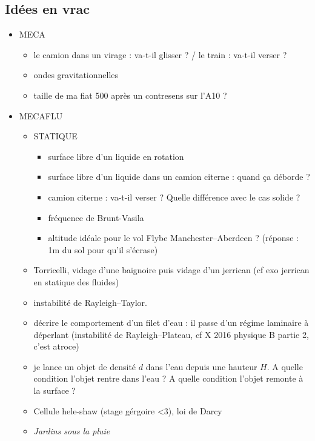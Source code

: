 \subsection*{Idées en vrac}
\begin{itemize}
    \item MECA
    \begin{itemize}
        \item le camion dans un virage : va-t-il glisser ? / le train : va-t-il verser ?
        \item ondes gravitationnelles
        \item taille de ma fiat 500 après un contresens sur l'A10 ?
    \end{itemize}
    \item MECAFLU
    \begin{itemize}
        \item STATIQUE
        \begin{itemize}
            \item surface libre d'un liquide en rotation
            \item surface libre d'un liquide dans un camion citerne : quand ça déborde ?
            \item camion citerne : va-t-il verser ? Quelle différence avec le cas solide ?
            \item fréquence de Brunt-Vasila
            \item altitude idéale pour le vol Flybe Manchester--Aberdeen ? (réponse : 1m du sol pour qu'il s'écrase)
        \end{itemize}
        \item Torricelli, vidage d'une baignoire puis vidage d'un jerrican (cf exo jerrican en statique des fluides)
        \item instabilité de Rayleigh--Taylor.
        \item décrire le comportement d'un filet d'eau : il passe d'un régime laminaire à déperlant (instabilité de Rayleigh--Plateau,  cf X 2016 physique B partie 2, c'est atroce)
        \item je lance un objet de densité $d$ dans l'eau depuis une hauteur $H$. A quelle condition l'objet rentre dans l'eau ? A quelle condition l'objet remonte à la surface ?
        \item Cellule hele-shaw (stage gérgoire <3), loi de Darcy
        \item \emph{Jardins sous la pluie}
            

\end{itemize}
\end{itemize}
